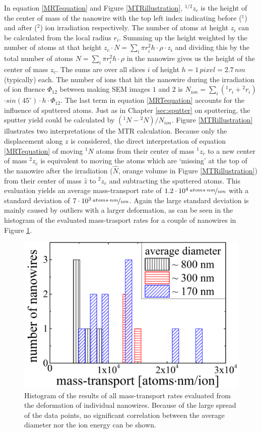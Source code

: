 In equation \ref{MRTequation} and Figure \ref{MTRillustration}, ${}^{1/2}z_{c}$ is the height of the center of mass of the nanowire with the top left index indicating before ($^1$) and after ($^2$) ion irradiation respectively. The number of atoms at height $z_i$ can be calculated from the local radius $r_i$. Summing up the height weighted by the number of atoms at that height $z_{c} \cdot N = \sum_i{\pi r_i^2 h \cdot \rho \cdot z_i}$ and dividing this by the total number of atoms $N = \sum_i{\pi r_i^2 h \cdot \rho}$ in the nanowire gives us the height of the center of mass $z_{c}$. The sums are over all slices $i$ of height $h = 1\,pixel = 2.7\,nm$ (typically) each. The number of ions that hit the nanowire during the irradiation of ion fluence $\Phi_{12}$ between making SEM images $1$ and $2$ is $N_{ion} = \sum_i{({}^{1}r_i+{}^{2}r_i)}$ $\cdot sin(45^\circ) \cdot h \cdot \Phi_{12}$. The last term in equation \ref{MRTequation} accounts for the influence of sputtered atoms. Just as in Chapter \ref{sec:sputter} on sputtering, the sputter yield could be calculated by $({}^{1}N - {}^{2}N)/N_{ion}$. Figure \ref{MTRillustration} illustrates two interpretations of the MTR calculation. Because only the displacement along $z$ is considered, the direct interpretation of equation \ref{MRTequation} of moving ${}^{1}N$ atoms from their center of mass ${}^{1}z_{c}$ to a new center of mass ${}^{2}z_{c}$ is equivalent to moving the atoms which are `missing' at the top of the nanowire after the irradiation ($\hat{N}$, orange volume in Figure \ref{MTRillustration}) from their center of mass $\hat{z}$ to ${}^{2}z_{c}$ and subtracting the sputtered atoms. This evaluation yields an average mass-transport rate of $1.2\cdot10^4 \,\nicefrac{atoms \cdot nm}{ion}$ with a standard deviation of $7\cdot 10^3\,\nicefrac{atoms \cdot nm}{ion}$. Again the large standard deviation is mainly caused by outliers with a larger deformation, as can be seen in the histogram of the evaluated mass-trasport rates for a couple of nanowires in Figure \ref{MTReval}.

\begin{figure}
	\centering
		\includegraphics[width=.5\textwidth]{images/MTReval.png}
	\caption{Histogram of the results of all mass-transport rates evaluated from the deformation of individual nanowires. Because of the large spread of the data points, no significant correlation between the average diameter nor the ion energy can be shown.}
	\label{MTReval}
\end{figure}


